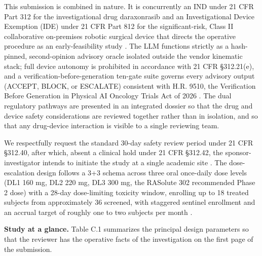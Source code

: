 This submission is combined in nature. It is concurrently an IND under 21 CFR Part 312 for the investigational drug daraxonrasib and an Investigational Device Exemption (IDE) under 21 CFR Part 812 for the significant-risk, Class II collaborative on-premises robotic surgical device that directs the operative procedure as an early-feasibility study \cite{onpremwhippl,paiautospons}. The LLM functions strictly as a hash-pinned, second-opinion advisory oracle isolated outside the vendor kinematic stack; full device autonomy is prohibited in accordance with 21 CFR \S 312.21(e), and a verification-before-generation ten-gate suite governs every advisory output (ACCEPT, BLOCK, or ESCALATE) consistent with H.R. 9510, the Verification Before Generation in Physical AI Oncology Trials Act of 2026 \cite{congress9510,clintrustpai}. The dual regulatory pathways are presented in an integrated dossier so that the drug and device safety considerations are reviewed together rather than in isolation, and so that any drug-device interaction is visible to a single reviewing team.

We respectfully request the standard 30-day safety review period under 21 CFR \S 312.40, after which, absent a clinical hold under 21 CFR \S 312.42, the sponsor-investigator intends to initiate the study at a single academic site \cite{phase1guidance}. The dose-escalation design follows a 3+3 schema across three oral once-daily dose levels (DL1 160 mg, DL2 220 mg, DL3 300 mg, the RASolute 302 recommended Phase 2 dose) with a 28-day dose-limiting toxicity window, enrolling up to 18 treated subjects from approximately 36 screened, with staggered sentinel enrollment and an accrual target of roughly one to two subjects per month \cite{daraxwhipple}.

\noindent\textbf{Study at a glance.} Table C.1 summarizes the principal design parameters so that the reviewer has the operative facts of the investigation on the first page of the submission.

